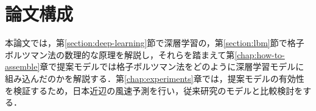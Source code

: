 
\section{論文構成}
本論文では，第\ref{section:deep-learning}節で深層学習の，第\ref{section:lbm}節で格子ボルツマン法の数理的な原理を解説し，それらを踏まえて第\ref{chap:how-to-assemble}章で提案モデルでは格子ボルツマン法をどのように深層学習モデルに組み込んだのかを解説する．第\ref{chap:experiments}章では，提案モデルの有効性を検証するため，日本近辺の風速予測を行い，従来研究のモデルと比較検討をする．